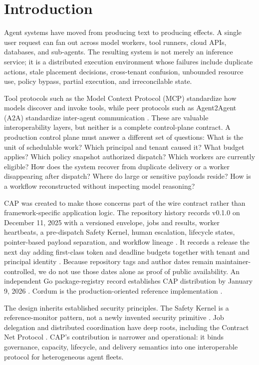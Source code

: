 \section{Introduction}

Agent systems have moved from producing text to producing effects. A single user request can fan out across model workers, tool runners, cloud APIs, databases, and sub-agents. The resulting system is not merely an inference service; it is a distributed execution environment whose failures include duplicate actions, stale placement decisions, cross-tenant confusion, unbounded resource use, policy bypass, partial execution, and irreconcilable state.

Tool protocols such as the Model Context Protocol (MCP) standardize how models discover and invoke tools, while peer protocols such as Agent2Agent (A2A) standardize inter-agent communication \citep{mcp2024,a2a2025}. These are valuable interoperability layers, but neither is a complete control-plane contract. A production control plane must answer a different set of questions: What is the unit of schedulable work? Which principal and tenant caused it? What budget applies? Which policy snapshot authorized dispatch? Which workers are currently eligible? How does the system recover from duplicate delivery or a worker disappearing after dispatch? Where do large or sensitive payloads reside? How is a workflow reconstructed without inspecting model reasoning?

CAP was created to make those concerns part of the wire contract rather than framework-specific application logic. The repository history records v0.1.0 on December 11, 2025 with a versioned envelope, jobs and results, worker heartbeats, a pre-dispatch Safety Kernel, human escalation, lifecycle states, pointer-based payload separation, and workflow lineage \citep{cap_v010}. It records a release the next day adding first-class token and deadline budgets together with tenant and principal identity \citep{cap_v200}. Because repository tags and author dates remain maintainer-controlled, we do not use those dates alone as proof of public availability. An independent Go package-registry record establishes CAP distribution by January 9, 2026 \citep{cap_pkg_registry}. Cordum is the production-oriented reference implementation \citep{cordum_current,cordum_disclosure2026}.

The design inherits established security principles. The Safety Kernel is a reference-monitor pattern, not a newly invented security primitive \citep{anderson1972reference,saltzer1975protection}. Job delegation and distributed coordination have deep roots, including the Contract Net Protocol \citep{smith1980contractnet}. CAP's contribution is narrower and operational: it binds governance, capacity, lifecycle, and delivery semantics into one interoperable protocol for heterogeneous agent fleets.

